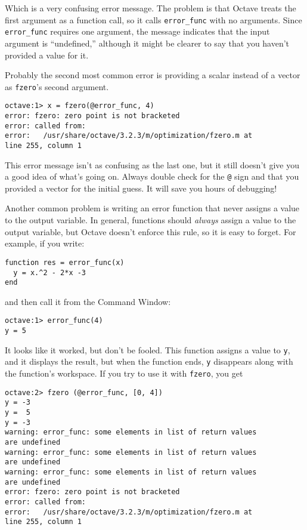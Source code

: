 Which is a very confusing error message. The problem is that Octave
treats the first argument as a function call, so it calls {\tt error\_func}
with no arguments. Since {\tt error\_func} requires one argument, the
message indicates that the input argument is ``undefined,'' although
it might be clearer to say that you haven't provided a value for it.

Probably the second most common error is providing a scalar instead of a vector
as {\tt fzero}'s second argument.

\begin{verbatim}
octave:1> x = fzero(@error_func, 4)
error: fzero: zero point is not bracketed
error: called from:
error:   /usr/share/octave/3.2.3/m/optimization/fzero.m at 
line 255, column 1
\end{verbatim}
 
This error message isn't as confusing as the last one, but it still doesn't
give you a good idea of what's going on. Always double check for the {\tt @}
sign and that you provided a vector for the initial guess. It will save you
hours of debugging!

Another common problem is writing an error function that never
assigns a value to the output variable. In general, functions should
{\em always} assign a value to the output variable, but Octave doesn't
enforce this rule, so it is easy to forget. For example, if you
write:

\begin{verbatim}
function res = error_func(x)
  y = x.^2 - 2*x -3
end
\end{verbatim}

and then call it from the Command Window:

\begin{verbatim}
octave:1> error_func(4)
y = 5
\end{verbatim}

It looks like it worked, but don't be fooled. This function assigns
a value to {\tt y}, and it displays the result, but when the function
ends, {\tt y} disappears along with the function's workspace.
If you try to use it with {\tt fzero}, you get

\begin{verbatim}
octave:2> fzero (@error_func, [0, 4])
y = -3
y =  5
y = -3
warning: error_func: some elements in list of return values 
are undefined
warning: error_func: some elements in list of return values 
are undefined
warning: error_func: some elements in list of return values 
are undefined
error: fzero: zero point is not bracketed
error: called from:
error:   /usr/share/octave/3.2.3/m/optimization/fzero.m at 
line 255, column 1
\end{verbatim}

